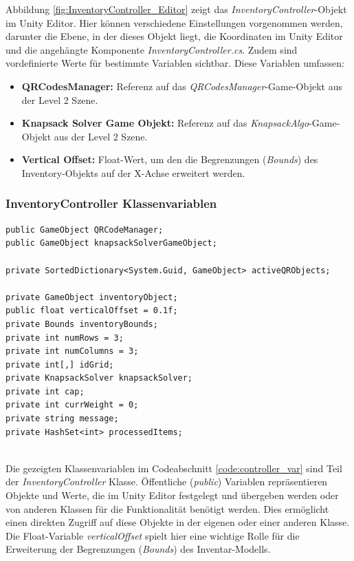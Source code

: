 Abbildung \ref{fig:InventoryController_Editor} zeigt das \textit{InventoryController}-Objekt im Unity Editor. Hier können
verschiedene Einstellungen vorgenommen werden, darunter die Ebene, in der dieses Objekt liegt, die Koordinaten im Unity
Editor und die angehängte Komponente \textit{InventoryController.cs}. Zudem sind vordefinierte Werte für bestimmte
Variablen sichtbar. Diese Variablen umfassen:
\begin{itemize}
    \item \textbf{QRCodesManager:} Referenz auf das \textit{QRCodesManager}-Game-Objekt aus der Level 2 Szene.
    \item \textbf{Knapsack Solver Game Objekt:} Referenz auf das \textit{KnapsackAlgo}-Game-Objekt aus der Level 2 Szene.
    \item \textbf{Vertical Offset:} Float-Wert, um den die Begrenzungen (\textit{Bounds}) des Inventory-Objekts auf der
    X-Achse erweitert werden.
\end{itemize}

\subsubsection{InventoryController Klassenvariablen}
\begin{lstlisting}[style=csharp, caption={Klassenvariablen der InventoryController Klasse}, label=code:controller_var]
public GameObject QRCodeManager;
public GameObject knapsackSolverGameObject;

private SortedDictionary<System.Guid, GameObject> activeQRObjects;

private GameObject inventoryObject;
public float verticalOffset = 0.1f;
private Bounds inventoryBounds;
private int numRows = 3;
private int numColumns = 3;
private int[,] idGrid;
private KnapsackSolver knapsackSolver;
private int cap;
private int currWeight = 0;
private string message;
private HashSet<int> processedItems;
\end{lstlisting}\\
Die gezeigten Klassenvariablen im Codeabschnitt \ref{code:controller_var} sind Teil der \textit{InventoryController} Klasse.
Öffentliche (\textit{public}) Variablen repräsentieren Objekte und Werte, die im Unity Editor festgelegt und übergeben
werden oder von anderen Klassen für die Funktionalität benötigt werden. Dies ermöglicht einen direkten Zugriff auf diese
Objekte in der eigenen oder einer anderen Klasse. Die Float-Variable \textit{verticalOffset} spielt hier eine wichtige
Rolle für die Erweiterung der Begrenzungen (\textit{Bounds}) des Inventar-Modells.

